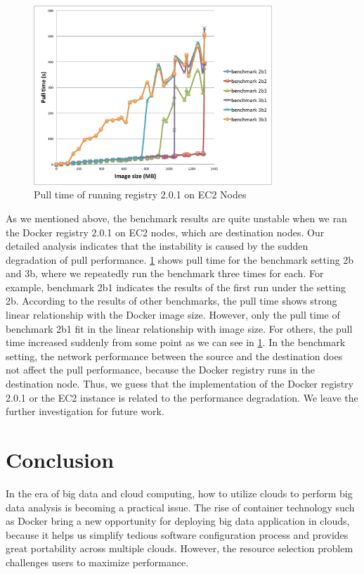 \documentclass{ieicej}
\begin{document}
\begin{figure}[ht]
  \begin{center}
  \includegraphics[width=0.8\textwidth,natwidth=1100,natheight=500]{5_pull_time_of_running_docker_registry_2.0.1_on_EC2_nodes.pdf}
  \end{center}
  \caption{Pull time of running registry 2.0.1 on EC2 Nodes}
  \label{pull_time}
\end{figure}

As we mentioned above, the benchmark results are quite unstable when we ran the Docker registry 2.0.1 on EC2 nodes, which are destination nodes.
Our detailed analysis indicates that the instability is caused by the sudden degradation of pull performance.
\cref{pull_time} shows pull time for the benchmark setting 2b and 3b, where we repeatedly run the benchmark three times for each.
For example, benchmark 2b1 indicates the results of the first run under the setting 2b.
According to the results of other benchmarks, the pull time shows strong linear relationship with the Docker image size.
However, only the pull time of benchmark 2b1 fit in the linear relationship with image size.
For others, the pull time increased suddenly from some point as we can see in \cref{pull_time}.
In the benchmark setting, the network performance between the source and the destination does not affect the pull performance, because the Docker registry runs in the destination node.
Thus, we guess that the implementation of the Docker registry 2.0.1 or the EC2 instance is related to the performance degradation.
We leave the further investigation for future work.


\section{Conclusion}
In the era of big data and cloud computing, how to utilize clouds to perform big data analysis is becoming a practical issue. The rise of container technology such as Docker bring a new opportunity for deploying big data application in clouds, because it helps us simplify tedious software configuration process and provides great portability across multiple clouds. However, the resource selection problem challenges users to maximize performance.
\end{document}

